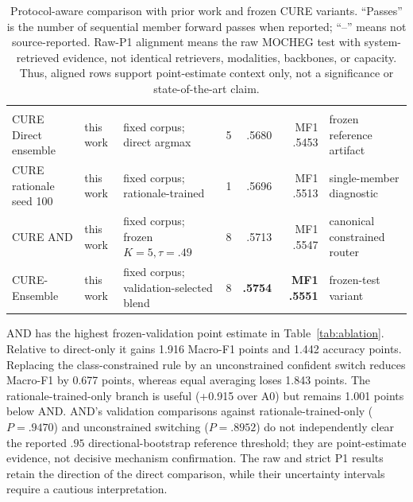 \documentclass[11pt]{article}
\begin{document}
\begin{table}[t]
\begin{tabular}{@{}p{2.25cm}p{1.60cm}p{2.90cm}crrp{2.40cm}@{}}
\addlinespace
\multicolumn{7}{@{}l}{\textit{This work: frozen raw official P1 ($n=2{,}442$)}}\\
\addlinespace[-2pt]
CURE Direct ensemble & this work & fixed corpus; direct argmax & 5 & .5680 & MF1 .5453 & frozen reference artifact\\
CURE rationale seed 100 & this work & fixed corpus; rationale-trained & 1 & .5696 & MF1 .5513 & single-member diagnostic\\
CURE AND & this work & fixed corpus; frozen $K=5,\tau=.49$ & 8 & .5713 & MF1 .5547 & canonical constrained router\\
CURE-Ensemble & this work & fixed corpus; validation-selected blend & 8 & \textbf{.5754} & \textbf{MF1 .5551} & frozen-test variant\\
\bottomrule
\end{tabular}
\caption{Protocol-aware comparison with prior work and frozen CURE variants. ``Passes'' is the number of sequential member forward passes when reported; ``--'' means not source-reported. Raw-P1 alignment means the raw MOCHEG test with system-retrieved evidence, not identical retrievers, modalities, backbones, or capacity. Thus, aligned rows support point-estimate context only, not a significance or state-of-the-art claim.}\label{tab:prior-inventory}
\end{table}

AND has the highest frozen-validation point estimate in Table~\ref{tab:ablation}. Relative to direct-only it gains 1.916 Macro-F1 points and 1.442 accuracy points. Replacing the class-constrained rule by an unconstrained confident switch reduces Macro-F1 by 0.677 points, whereas equal averaging loses 1.843 points. The rationale-trained-only branch is useful (+0.915 over A0) but remains 1.001 points below AND. AND's validation comparisons against rationale-trained-only ($P=.9470$) and unconstrained switching ($P=.8952$) do not independently clear the reported $.95$ directional-bootstrap reference threshold; they are point-estimate evidence, not decisive mechanism confirmation. The raw and strict P1 results retain the direction of the direct comparison, while their uncertainty intervals require a cautious interpretation.
\end{document}
